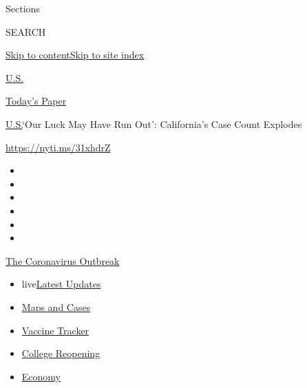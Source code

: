 Sections

SEARCH

\protect\hyperlink{site-content}{Skip to
content}\protect\hyperlink{site-index}{Skip to site index}

\href{https://www.nytimes.com/section/us}{U.S.}

\href{https://myaccount.nytimes.com/auth/login?response_type=cookie\&client_id=vi}{}

\href{https://www.nytimes.com/section/todayspaper}{Today's Paper}

\href{/section/us}{U.S.}\textbar{}`Our Luck May Have Run Out':
California's Case Count Explodes

\url{https://nyti.ms/31xhdrZ}

\begin{itemize}
\item
\item
\item
\item
\item
\item
\end{itemize}

\href{https://www.nytimes.com/news-event/coronavirus?action=click\&pgtype=Article\&state=default\&region=TOP_BANNER\&context=storylines_menu}{The
Coronavirus Outbreak}

\begin{itemize}
\tightlist
\item
  live\href{https://www.nytimes.com/2020/08/04/world/coronavirus-cases.html?action=click\&pgtype=Article\&state=default\&region=TOP_BANNER\&context=storylines_menu}{Latest
  Updates}
\item
  \href{https://www.nytimes.com/interactive/2020/us/coronavirus-us-cases.html?action=click\&pgtype=Article\&state=default\&region=TOP_BANNER\&context=storylines_menu}{Maps
  and Cases}
\item
  \href{https://www.nytimes.com/interactive/2020/science/coronavirus-vaccine-tracker.html?action=click\&pgtype=Article\&state=default\&region=TOP_BANNER\&context=storylines_menu}{Vaccine
  Tracker}
\item
  \href{https://www.nytimes.com/2020/08/02/us/covid-college-reopening.html?action=click\&pgtype=Article\&state=default\&region=TOP_BANNER\&context=storylines_menu}{College
  Reopening}
\item
  \href{https://www.nytimes.com/live/2020/08/04/business/stock-market-today-coronavirus?action=click\&pgtype=Article\&state=default\&region=TOP_BANNER\&context=storylines_menu}{Economy}
\end{itemize}

